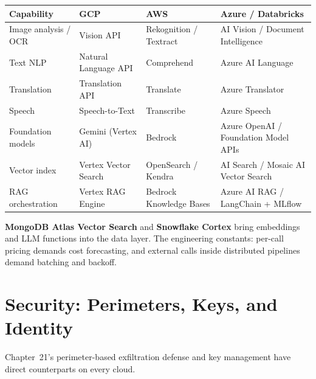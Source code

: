 \begin{center}
\footnotesize
\begin{tabular}{@{}p{2.8cm}p{3.0cm}p{3.0cm}p{3.4cm}@{}}
\toprule
\textbf{Capability} & \textbf{GCP} & \textbf{AWS} & \textbf{Azure / Databricks} \\
\midrule
Image analysis / OCR & Vision API & Rekognition / Textract & AI Vision / Document Intelligence \\
Text NLP & Natural Language API & Comprehend & Azure AI Language \\
Translation & Translation API & Translate & Azure Translator \\
Speech & Speech-to-Text & Transcribe & Azure Speech \\
Foundation models & Gemini (Vertex AI) & Bedrock & Azure OpenAI / Foundation Model APIs \\
Vector index & Vertex Vector Search & OpenSearch / Kendra & AI Search / Mosaic AI Vector Search \\
RAG orchestration & Vertex RAG Engine & Bedrock Knowledge Bases & Azure AI RAG / LangChain + MLflow \\
\bottomrule
\end{tabular}
\end{center}

\noindent \textbf{MongoDB Atlas Vector Search} and \textbf{Snowflake Cortex} bring embeddings and
LLM functions into the data layer. The engineering constants: per-call pricing demands cost
forecasting, and external calls inside distributed pipelines demand batching and backoff.

\section{Security: Perimeters, Keys, and Identity}
%
Chapter~21's perimeter-based exfiltration defense and key management have direct counterparts on
every cloud.

